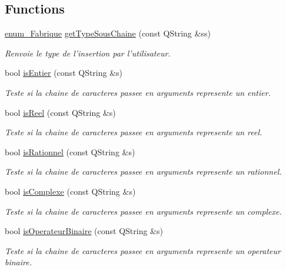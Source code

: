 \subsection*{\-Functions}
\begin{DoxyCompactItemize}
\item 
\hyperlink{namespace_l_o21_acedc482cdf54c16ec5847664c2104aab}{enum\-\_\-\-Fabrique} \hyperlink{namespace_l_o21_aafd66eca2e00d985b4503486478beb78}{get\-Type\-Sous\-Chaine} (const \-Q\-String \&ss)
\begin{DoxyCompactList}\small\item\em \-Renvoie le type de l'insertion par l'utilisateur. \end{DoxyCompactList}\item 
bool \hyperlink{namespace_l_o21_a26bcc8afda7149155934e73977da8813}{is\-Entier} (const \-Q\-String \&s)
\begin{DoxyCompactList}\small\item\em \-Teste si la chaine de caracteres passee en arguments represente un entier. \end{DoxyCompactList}\item 
bool \hyperlink{namespace_l_o21_a1b38b06c9cb86dd25463f89e6e0e2699}{is\-Reel} (const \-Q\-String \&s)
\begin{DoxyCompactList}\small\item\em \-Teste si la chaine de caracteres passee en arguments represente un reel. \end{DoxyCompactList}\item 
bool \hyperlink{namespace_l_o21_a01ed79112e78688a98681f5ef74c97df}{is\-Rationnel} (const \-Q\-String \&s)
\begin{DoxyCompactList}\small\item\em \-Teste si la chaine de caracteres passee en arguments represente un rationnel. \end{DoxyCompactList}\item 
bool \hyperlink{namespace_l_o21_a2f4921c9ac0725a6271eba52d5912c47}{is\-Complexe} (const \-Q\-String \&s)
\begin{DoxyCompactList}\small\item\em \-Teste si la chaine de caracteres passee en arguments represente un complexe. \end{DoxyCompactList}\item 
bool \hyperlink{namespace_l_o21_af79ccb94531e201044324d7e725b1b62}{is\-Operateur\-Binaire} (const \-Q\-String \&s)
\begin{DoxyCompactList}\small\item\em \-Teste si la chaine de caracteres passee en arguments represente un operateur binaire. \end{DoxyCompactList}\item 

\end{DoxyCompactItemize}
